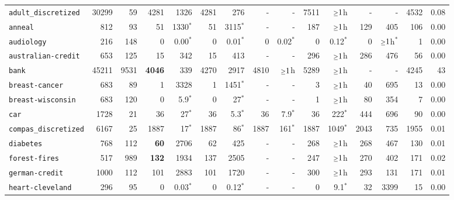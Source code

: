 \begin{tabular}{lccrrrrrrrrrrrr}
\texttt{adult\_discretized} & \multicolumn{1}{r}{30299} & \multicolumn{1}{r}{59}  & 4281 & 1326 & 4281 & 276 & - & - & 7511 & $\mathsmaller{\geq}1$h & - & - & 4532 & 0.08\\
\texttt{anneal} & \multicolumn{1}{r}{812} & \multicolumn{1}{r}{93}  & 51 & 1330$^*$ & 51 & 3115$^*$ & - & - & 187 & $\mathsmaller{\geq}1$h & 129 & 405 & 106 & 0.00\\
\texttt{audiology} & \multicolumn{1}{r}{216} & \multicolumn{1}{r}{148}  & 0 & 0.00$^*$ & 0 & 0.01$^*$ & 0 & 0.02$^*$ & 0 & 0.12$^*$ & 0 & $\mathsmaller{\geq}1$h$^*$ & 1 & 0.00\\
\texttt{australian-credit} & \multicolumn{1}{r}{653} & \multicolumn{1}{r}{125}  & 15 & 342 & 15 & 413 & - & - & 296 & $\mathsmaller{\geq}1$h & 286 & 476 & 56 & 0.00\\
\texttt{bank} & \multicolumn{1}{r}{45211} & \multicolumn{1}{r}{9531}  & \textbf{4046} & 339 & 4270 & 2917 & 4810 & $\mathsmaller{\geq}1$h & 5289 & $\mathsmaller{\geq}1$h & - & - & 4245 & 43\\
\texttt{breast-cancer} & \multicolumn{1}{r}{683} & \multicolumn{1}{r}{89}  & 1 & 3328 & 1 & 1451$^*$ & - & - & 3 & $\mathsmaller{\geq}1$h & 40 & 695 & 13 & 0.00\\
\texttt{breast-wisconsin} & \multicolumn{1}{r}{683} & \multicolumn{1}{r}{120}  & 0 & 5.9$^*$ & 0 & 27$^*$ & - & - & 1 & $\mathsmaller{\geq}1$h & 80 & 354 & 7 & 0.00\\
\texttt{car} & \multicolumn{1}{r}{1728} & \multicolumn{1}{r}{21}  & 36 & 27$^*$ & 36 & 5.3$^*$ & 36 & 7.9$^*$ & 36 & 222$^*$ & 444 & 696 & 90 & 0.00\\
\texttt{compas\_discretized} & \multicolumn{1}{r}{6167} & \multicolumn{1}{r}{25}  & 1887 & 17$^*$ & 1887 & 86$^*$ & 1887 & 161$^*$ & 1887 & 1049$^*$ & 2043 & 735 & 1955 & 0.01\\
\texttt{diabetes} & \multicolumn{1}{r}{768} & \multicolumn{1}{r}{112}  & \textbf{60} & 2706 & 62 & 425 & - & - & 268 & $\mathsmaller{\geq}1$h & 268 & 467 & 130 & 0.01\\
\texttt{forest-fires} & \multicolumn{1}{r}{517} & \multicolumn{1}{r}{989}  & \textbf{132} & 1934 & 137 & 2505 & - & - & 247 & $\mathsmaller{\geq}1$h & 270 & 402 & 171 & 0.02\\
\texttt{german-credit} & \multicolumn{1}{r}{1000} & \multicolumn{1}{r}{112}  & 101 & 2883 & 101 & 1720 & - & - & 300 & $\mathsmaller{\geq}1$h & 293 & 131 & 171 & 0.01\\
\texttt{heart-cleveland} & \multicolumn{1}{r}{296} & \multicolumn{1}{r}{95}  & 0 & 0.03$^*$ & 0 & 0.12$^*$ & - & - & 0 & 9.1$^*$ & 32 & 3399 & 15 & 0.00\\

\end{tabular}
